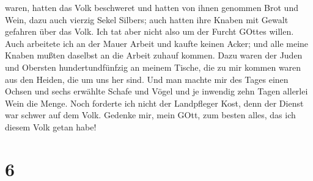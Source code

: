 waren, hatten das Volk beschweret und hatten von ihnen genommen Brot und
Wein, dazu auch vierzig Sekel Silbers; auch hatten ihre Knaben mit
Gewalt gefahren über das Volk. Ich tat aber nicht also um der Furcht
GOttes willen.  Auch arbeitete ich an der Mauer Arbeit und
kaufte keinen Acker; und alle meine Knaben mußten daselbst an die Arbeit
zuhauf kommen.  Dazu waren der Juden und Obersten
hundertundfünfzig an meinem Tische, die zu mir kommen waren aus den
Heiden, die um uns her sind.  Und man machte mir des Tages
einen Ochsen und sechs erwählte Schafe und Vögel und je inwendig zehn
Tagen allerlei Wein die Menge. Noch forderte ich nicht der Landpfleger
Kost, denn der Dienst war schwer auf dem Volk.  Gedenke
mir, mein GOtt, zum besten alles, das ich diesem Volk getan habe!

\hypertarget{section-5}{%
\section{6}\label{section-5}}

